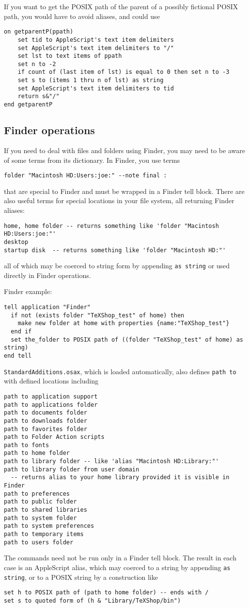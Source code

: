 \documentclass[11pt]{amsart}
\begin{document}
If you want to get the POSIX path of the parent of a possibly fictional POSIX path, you would have to avoid aliases, and could use
\begin{verbatim}
on getparentP(ppath)
    set tid to AppleScript's text item delimiters
    set AppleScript's text item delimiters to "/"
    set lst to text items of ppath
    set n to -2
    if count of (last item of lst) is equal to 0 then set n to -3
    set s to (items 1 thru n of lst) as string
    set AppleScript's text item delimiters to tid
    return s&"/"	
end getparentP
\end{verbatim}
\subsection{Finder operations}
If you need to deal with files and folders using Finder, you may need to be aware of some terms from its dictionary. In Finder, you use terms
\begin{verbatim}
folder "Macintosh HD:Users:joe:" --note final :
\end{verbatim}
that are special to Finder and must be wrapped in a Finder tell block. There are also useful terms for special locations in your file system, all returning Finder aliases:
\begin{verbatim}
home, home folder -- returns something like 'folder "Macintosh HD:Users:joe:"'
desktop
startup disk  -- returns something like 'folder "Macintosh HD:"'
\end{verbatim} 
all of which may be coerced to string form by appending {\tt as string} or used directly in Finder operations.

Finder example:
\begin{verbatim}
tell application "Finder"
  if not (exists folder "TeXShop_test" of home) then
    make new folder at home with properties {name:"TeXShop_test"}
  end if
  set the_folder to POSIX path of ((folder "TeXShop_test" of home) as string)
end tell
\end{verbatim}
{\tt StandardAdditions.osax}, which is loaded automatically, also defines {\tt path to}   with defined locations including
\begin{verbatim}
path to application support
path to applications folder
path to documents folder
path to downloads folder
path to favorites folder
path to Folder Action scripts
path to fonts
path to home folder
path to library folder -- like 'alias "Macintosh HD:Library:"'
path to library folder from user domain 
  -- returns alias to your home library provided it is visible in Finder
path to preferences
path to public folder
path to shared libraries
path to system folder
path to system preferences
path to temporary items
path to users folder
\end{verbatim}
The commands need not be run only in a Finder tell block. The result in each case is an AppleScript alias, which may coerced to a string by appending {\tt as string}, or to a POSIX string by a construction like
\begin{verbatim}
set h to POSIX path of (path to home folder) -- ends with /
set s to quoted form of (h & "Library/TeXShop/bin")
\end{verbatim}
\end{document}

